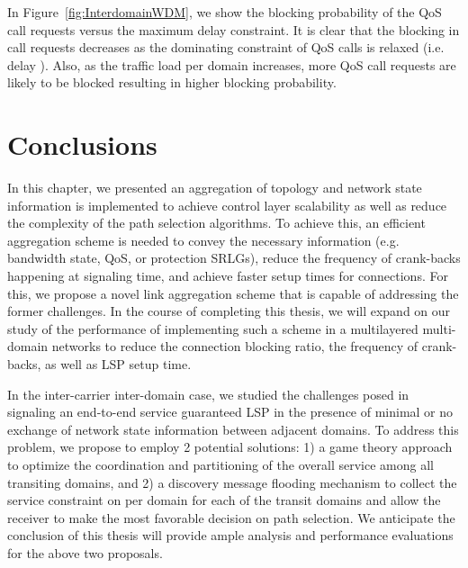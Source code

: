 In Figure~\ref{fig:InterdomainWDM}, we show the blocking probability of the QoS call requests versus the maximum delay constraint. It is clear that the blocking in call requests decreases as the dominating constraint of QoS calls is relaxed (i.e. delay  ). Also, as the traffic load per domain increases, more QoS call requests are likely to be blocked resulting in higher blocking probability.


\section{Conclusions}
In this chapter, we presented an aggregation of topology and network state information is implemented to achieve control layer scalability as well as reduce the complexity of the path selection algorithms. To achieve this, an efficient aggregation scheme is needed to convey the necessary information (e.g. bandwidth state, QoS, or protection SRLGs), reduce the frequency of crank-backs happening at signaling time, and achieve faster setup times for connections. For this, we propose a novel link aggregation scheme that is capable of addressing the former challenges. In the course of completing this thesis, we will expand on our study of the performance of implementing such a scheme in a multilayered multi-domain networks to reduce the connection blocking ratio, the frequency of crank-backs, as well as LSP setup time.

In the inter-carrier inter-domain case, we studied the challenges posed in signaling an end-to-end service guaranteed LSP in the presence of minimal or no exchange of network state information between adjacent domains. To address this problem, we propose to employ 2 potential solutions: 1) a game theory approach to optimize the coordination and partitioning of the overall service among all transiting domains, and 2) a discovery message flooding mechanism to collect the service constraint on per domain for each of the transit domains and allow the receiver to make the most favorable decision on path selection. We anticipate the conclusion of this thesis will provide ample analysis and performance evaluations for the above two proposals.

